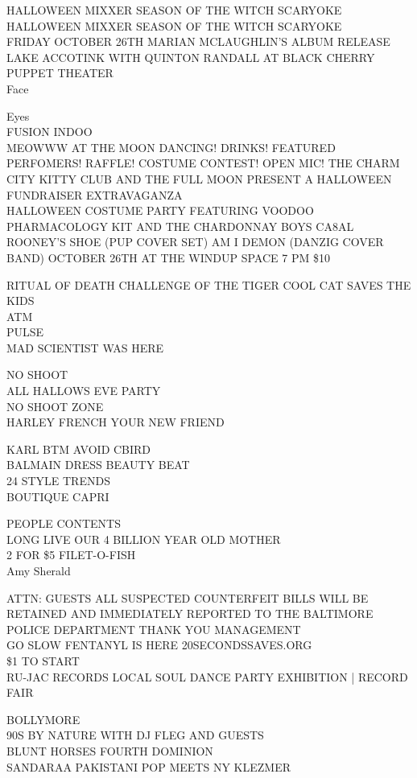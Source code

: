 \documentclass[10pt,letterpaper]{article}
\begin{document}
HALLOWEEN MIXXER SEASON OF THE WITCH SCARYOKE\\
HALLOWEEN MIXXER SEASON OF THE WITCH SCARYOKE\\
FRIDAY OCTOBER 26TH MARIAN MCLAUGHLIN'S ALBUM RELEASE LAKE ACCOTINK WITH QUINTON RANDALL AT BLACK CHERRY PUPPET THEATER\\
Face

Eyes\\
FUSION INDOO\\
MEOWWW AT THE MOON DANCING!  DRINKS!  FEATURED PERFOMERS!  RAFFLE!  COSTUME CONTEST!  OPEN MIC!  THE CHARM CITY KITTY CLUB AND THE FULL MOON PRESENT A HALLOWEEN FUNDRAISER EXTRAVAGANZA\\
HALLOWEEN COSTUME PARTY FEATURING VOODOO PHARMACOLOGY KIT AND THE CHARDONNAY BOYS CA8AL ROONEY'S SHOE (PUP COVER SET) AM I DEMON (DANZIG COVER BAND) OCTOBER 26TH AT THE WINDUP SPACE 7 PM \$10

RITUAL OF DEATH CHALLENGE OF THE TIGER COOL CAT SAVES THE KIDS\\
ATM\\
PULSE\\
MAD SCIENTIST WAS HERE

NO SHOOT\\
ALL HALLOWS EVE PARTY\\
NO SHOOT ZONE\\
HARLEY FRENCH YOUR NEW FRIEND

KARL BTM AVOID CBIRD\\
BALMAIN DRESS BEAUTY BEAT\\
24 STYLE TRENDS\\
BOUTIQUE CAPRI

PEOPLE CONTENTS\\
LONG LIVE OUR 4 BILLION YEAR OLD MOTHER\\
2 FOR \$5 FILET{-}O{-}FISH\\
Amy Sherald

ATTN: GUESTS ALL SUSPECTED COUNTERFEIT BILLS WILL BE RETAINED AND IMMEDIATELY REPORTED TO THE BALTIMORE POLICE DEPARTMENT THANK YOU MANAGEMENT\\
GO SLOW FENTANYL IS HERE 20SECONDSSAVES.ORG\\
\$1 TO START\\
RU{-}JAC RECORDS LOCAL SOUL DANCE PARTY EXHIBITION | RECORD FAIR

BOLLYMORE\\
90S BY NATURE WITH DJ FLEG AND GUESTS\\
BLUNT HORSES FOURTH DOMINION\\
SANDARAA PAKISTANI POP MEETS NY KLEZMER
\end{document}
